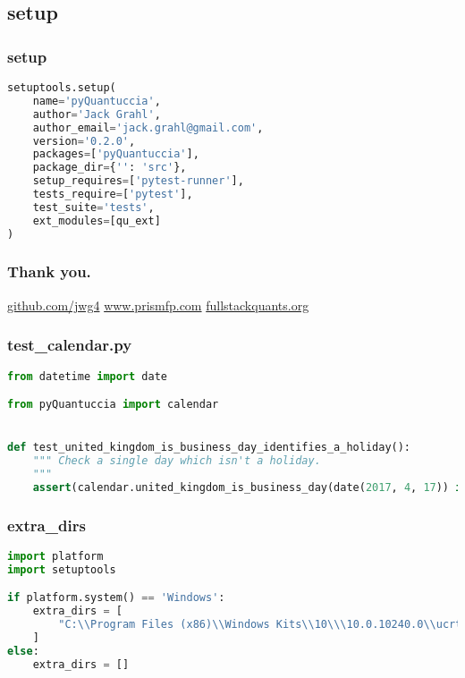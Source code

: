 \documentclass{beamer}
\begin{document}
	\subsection{setup}
	\begin{frame}[fragile]
		\frametitle{setup}
		\begin{lstlisting}[language=Python]
setuptools.setup(
    name='pyQuantuccia',
    author='Jack Grahl',
    author_email='jack.grahl@gmail.com',
    version='0.2.0',
    packages=['pyQuantuccia'],
    package_dir={'': 'src'},
    setup_requires=['pytest-runner'],
    tests_require=['pytest'],
    test_suite='tests',
    ext_modules=[qu_ext]
)
		\end{lstlisting}
	\end{frame}

	\begin{frame}
		\frametitle{Thank you.}
		\url{github.com/jwg4}
		\url{www.prismfp.com}
		\url{fullstackquants.org}
	\end{frame}

	\begin{frame}[fragile]
		\frametitle{test\_calendar.py}
		\begin{lstlisting}[language=Python]
from datetime import date

from pyQuantuccia import calendar


def test_united_kingdom_is_business_day_identifies_a_holiday():
    """ Check a single day which isn't a holiday.
    """
    assert(calendar.united_kingdom_is_business_day(date(2017, 4, 17)) is False)
		\end{lstlisting}
	\end{frame}

	\begin{frame}[fragile]
		\frametitle{extra\_dirs}
		\begin{lstlisting}[language=Python]
import platform
import setuptools

if platform.system() == 'Windows':
    extra_dirs = [
        "C:\\Program Files (x86)\\Windows Kits\\10\\\10.0.10240.0\\ucrt"
    ]
else:
    extra_dirs = []
		\end{lstlisting}
	\end{frame}
\end{document}
